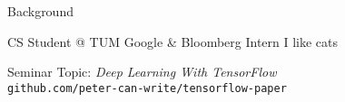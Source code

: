 
\begin{slide}{Background}
  \centering
  \begin{itemize}
    \pitem CS Student @ TUM
    \pitem Google \& Bloomberg Intern
    \pitem I like cats
  \end{itemize}
  \pause
  \vspace{0.3cm}
  Seminar Topic: \emph{Deep Learning With TensorFlow}\\
  \vspace{0.3cm}
  \texttt{github.com/peter-can-write/tensorflow-paper}
\end{slide}
